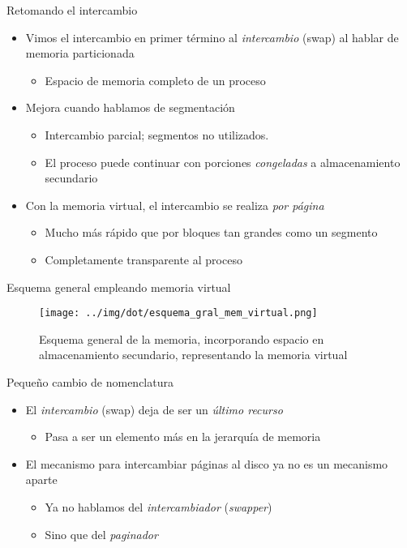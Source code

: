 \documentclass[presentation]{beamer}
\begin{document}
\begin{frame}[label={sec:orge3bc15b}]{Retomando el intercambio}
\begin{itemize}
\item Vimos el intercambio en primer término al \emph{intercambio} (swap) al
hablar de memoria particionada
\begin{itemize}
\item Espacio de memoria completo de un proceso
\end{itemize}
\item Mejora cuando hablamos de segmentación
\begin{itemize}
\item Intercambio parcial; segmentos no utilizados.
\item El proceso puede continuar con porciones \emph{congeladas} a
almacenamiento secundario
\end{itemize}
\item Con la memoria virtual, el intercambio se realiza \emph{por página}
\begin{itemize}
\item Mucho más rápido que por bloques tan grandes como un segmento
\item Completamente transparente al proceso
\end{itemize}
\end{itemize}
\end{frame}

\begin{frame}[label={sec:org49c2302}]{Esquema general empleando memoria virtual}
\begin{figure}[htbp]
\centering
\texttt{[image: ../img/dot/esquema\_gral\_mem\_virtual.png]}
\caption{Esquema general de la memoria, incorporando espacio en almacenamiento secundario, representando la memoria virtual}
\end{figure}
\end{frame}

\begin{frame}[label={sec:org58180d4}]{Pequeño cambio de nomenclatura}
\begin{itemize}
\item El \emph{intercambio} (swap) deja de ser un \emph{último recurso}
\begin{itemize}
\item Pasa a ser un elemento más en la jerarquía de memoria
\end{itemize}
\item El mecanismo para intercambiar páginas al disco ya no es un
mecanismo aparte
\begin{itemize}
\item Ya no hablamos del \emph{intercambiador} (\emph{swapper})
\item Sino que del \emph{paginador}
\end{itemize}
\end{itemize}
\end{frame}
\end{document}
